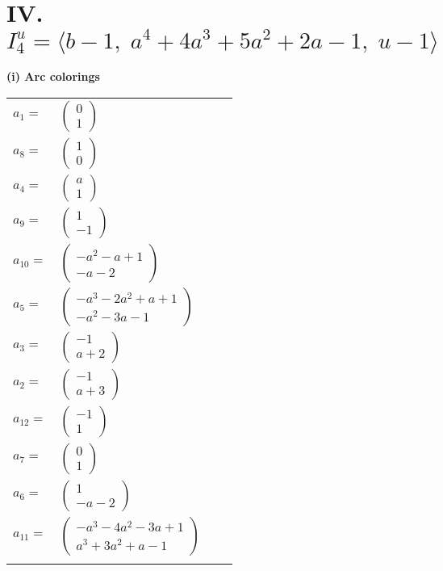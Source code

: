 \documentclass[1p]{elsarticle_modified}
\theoremstyle{definition}
\begin{document}
\centering \section*{IV. $I^u_{4}= \langle b-1,\;a^4+4 a^3+5 a^2+2 a-1,\;u-1 \rangle$}
\flushleft \textbf{(i) Arc colorings}\\
\begin{tabular}{m{7pt} m{180pt} m{7pt} m{180pt} }
\flushright $a_{1}=$&$\begin{pmatrix}0\\1\end{pmatrix}$ \\
\flushright $a_{8}=$&$\begin{pmatrix}1\\0\end{pmatrix}$ \\
\flushright $a_{4}=$&$\begin{pmatrix}a\\1\end{pmatrix}$ \\
\flushright $a_{9}=$&$\begin{pmatrix}1\\-1\end{pmatrix}$ \\
\flushright $a_{10}=$&$\begin{pmatrix}- a^2- a+1\\- a-2\end{pmatrix}$ \\
\flushright $a_{5}=$&$\begin{pmatrix}- a^3-2 a^2+a+1\\- a^2-3 a-1\end{pmatrix}$ \\
\flushright $a_{3}=$&$\begin{pmatrix}-1\\a+2\end{pmatrix}$ \\
\flushright $a_{2}=$&$\begin{pmatrix}-1\\a+3\end{pmatrix}$ \\
\flushright $a_{12}=$&$\begin{pmatrix}-1\\1\end{pmatrix}$ \\
\flushright $a_{7}=$&$\begin{pmatrix}0\\1\end{pmatrix}$ \\
\flushright $a_{6}=$&$\begin{pmatrix}1\\- a-2\end{pmatrix}$ \\
\flushright $a_{11}=$&$\begin{pmatrix}- a^3-4 a^2-3 a+1\\a^3+3 a^2+a-1\end{pmatrix}$\\&\end{tabular}
\end{document}
